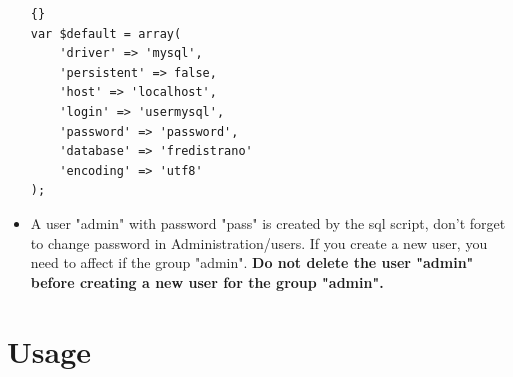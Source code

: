 \documentclass[12pt,a4paper]{report}
\begin{document}
\begin{itemize}
\begin{lstlisting}[frame=tb]{}
var $default = array(
	'driver' => 'mysql',
	'persistent' => false,
	'host' => 'localhost',
	'login' => 'usermysql',
	'password' => 'password',
	'database' => 'fredistrano'
	'encoding' => 'utf8'
);
\end{lstlisting}

\item A user "admin" with password "pass" is created by the sql script, don't forget to change password in Administration/users.
If you create a new user, you need to affect if the group "admin".
\textbf{Do not delete the user "admin" before creating a new user for the group "admin".}

\end{itemize}

\chapter{Usage}
\end{document}

